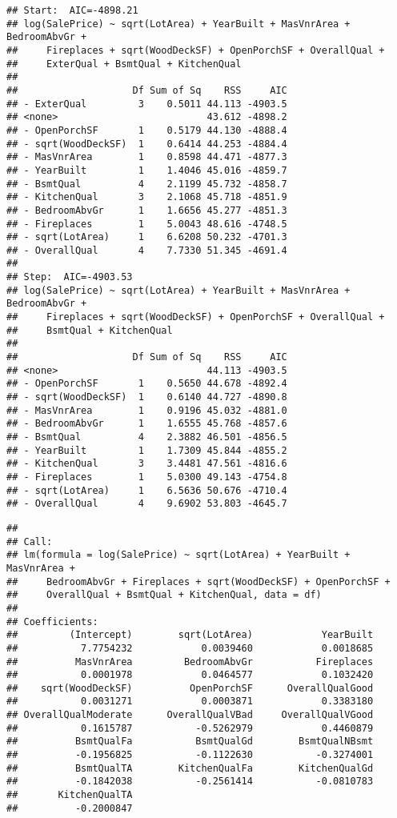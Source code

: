 \documentclass[
]{article}
\begin{document}
\begin{verbatim}
## Start:  AIC=-4898.21
## log(SalePrice) ~ sqrt(LotArea) + YearBuilt + MasVnrArea + BedroomAbvGr + 
##     Fireplaces + sqrt(WoodDeckSF) + OpenPorchSF + OverallQual + 
##     ExterQual + BsmtQual + KitchenQual
## 
##                    Df Sum of Sq    RSS     AIC
## - ExterQual         3    0.5011 44.113 -4903.5
## <none>                          43.612 -4898.2
## - OpenPorchSF       1    0.5179 44.130 -4888.4
## - sqrt(WoodDeckSF)  1    0.6414 44.253 -4884.4
## - MasVnrArea        1    0.8598 44.471 -4877.3
## - YearBuilt         1    1.4046 45.016 -4859.7
## - BsmtQual          4    2.1199 45.732 -4858.7
## - KitchenQual       3    2.1068 45.718 -4851.9
## - BedroomAbvGr      1    1.6656 45.277 -4851.3
## - Fireplaces        1    5.0043 48.616 -4748.5
## - sqrt(LotArea)     1    6.6208 50.232 -4701.3
## - OverallQual       4    7.7330 51.345 -4691.4
## 
## Step:  AIC=-4903.53
## log(SalePrice) ~ sqrt(LotArea) + YearBuilt + MasVnrArea + BedroomAbvGr + 
##     Fireplaces + sqrt(WoodDeckSF) + OpenPorchSF + OverallQual + 
##     BsmtQual + KitchenQual
## 
##                    Df Sum of Sq    RSS     AIC
## <none>                          44.113 -4903.5
## - OpenPorchSF       1    0.5650 44.678 -4892.4
## - sqrt(WoodDeckSF)  1    0.6140 44.727 -4890.8
## - MasVnrArea        1    0.9196 45.032 -4881.0
## - BedroomAbvGr      1    1.6555 45.768 -4857.6
## - BsmtQual          4    2.3882 46.501 -4856.5
## - YearBuilt         1    1.7309 45.844 -4855.2
## - KitchenQual       3    3.4481 47.561 -4816.6
## - Fireplaces        1    5.0300 49.143 -4754.8
## - sqrt(LotArea)     1    6.5636 50.676 -4710.4
## - OverallQual       4    9.6902 53.803 -4645.7
\end{verbatim}

\begin{verbatim}
## 
## Call:
## lm(formula = log(SalePrice) ~ sqrt(LotArea) + YearBuilt + MasVnrArea + 
##     BedroomAbvGr + Fireplaces + sqrt(WoodDeckSF) + OpenPorchSF + 
##     OverallQual + BsmtQual + KitchenQual, data = df)
## 
## Coefficients:
##         (Intercept)        sqrt(LotArea)            YearBuilt  
##           7.7754232            0.0039460            0.0018685  
##          MasVnrArea         BedroomAbvGr           Fireplaces  
##           0.0001978            0.0464577            0.1032420  
##    sqrt(WoodDeckSF)          OpenPorchSF      OverallQualGood  
##           0.0031271            0.0003871            0.3383180  
## OverallQualModerate      OverallQualVBad     OverallQualVGood  
##           0.1615787           -0.5262979            0.4460879  
##          BsmtQualFa           BsmtQualGd        BsmtQualNBsmt  
##          -0.1956825           -0.1122630           -0.3274001  
##          BsmtQualTA        KitchenQualFa        KitchenQualGd  
##          -0.1842038           -0.2561414           -0.0810783  
##       KitchenQualTA  
##          -0.2000847
\end{verbatim}
\end{document}
